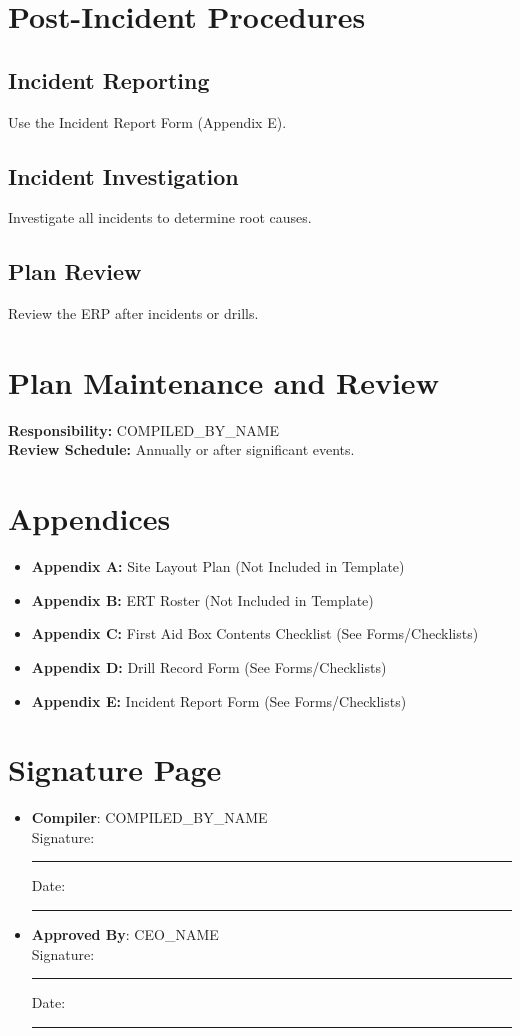 \documentclass[11pt]{article}
\newcommand{\compilerName}{{{COMPILED_BY_NAME}}}
\begin{document}
\section{Post-Incident Procedures}

\subsection{Incident Reporting}
Use the Incident Report Form (Appendix E).

\subsection{Incident Investigation}
Investigate all incidents to determine root causes.

\subsection{Plan Review}
Review the ERP after incidents or drills.

\section{Plan Maintenance and Review}
\textbf{Responsibility:} \compilerName \\
\textbf{Review Schedule:} Annually or after significant events.

\section{Appendices}
\begin{itemize}
    \item \textbf{Appendix A:} Site Layout Plan (Not Included in Template)
    \item \textbf{Appendix B:} ERT Roster (Not Included in Template)
    \item \textbf{Appendix C:} First Aid Box Contents Checklist (See Forms/Checklists)
    \item \textbf{Appendix D:} Drill Record Form (See Forms/Checklists)
    \item \textbf{Appendix E:} Incident Report Form (See Forms/Checklists)
\end{itemize}

\section{Signature Page}
\begin{itemize}
  \item \textbf{Compiler}: \compilerName \\
    Signature: \rule{5cm}{0.4pt} \quad Date: \rule{3cm}{0.4pt}
  \item \textbf{Approved By}: {{CEO_NAME}} \\
    Signature: \rule{5cm}{0.4pt} \quad Date: \rule{3cm}{0.4pt}
\end{itemize}
\end{document}
